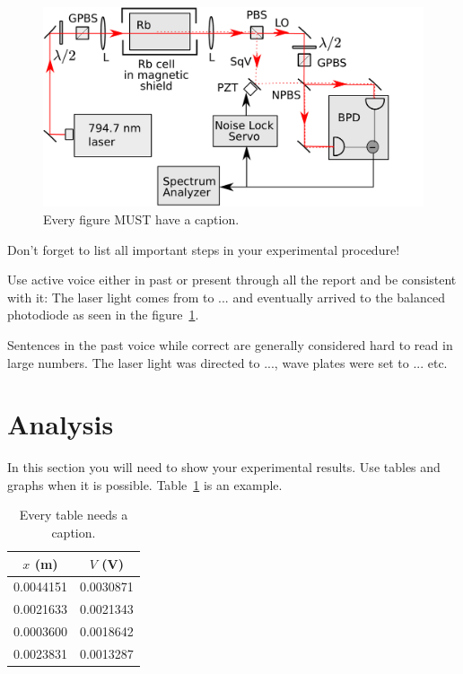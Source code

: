 \documentclass[letterpaper,12pt]{article}
\begin{document}
\begin{figure}[ht] 
        \centering \includegraphics[width=0.8\columnwidth]{sr_setup}
        \caption{
                \label{fig:samplesetup} %
                Every figure MUST have a caption.
        }
\end{figure}

Don't forget to list all important steps in your experimental procedure!

Use active voice either in past or present through all the report and be
consistent with it:
The laser light comes  from to ... and eventually arrived to the
balanced photodiode as seen in the figure~\ref{fig:samplesetup}.

Sentences in the past voice while correct are generally considered hard to read
in large numbers. The laser light was directed to ..., wave plates were set
to ... etc.


\section{Analysis}

In this section you will need to show your experimental results. Use tables and
graphs when it is possible. Table~\ref{tbl:bins} is an example.

\begin{table}[ht]
\begin{center}
\caption{Every table needs a caption.}
\label{tbl:bins} %
\begin{tabular}{|cc|} 
\hline
\multicolumn{1}{|c}{$x$ (m)} & \multicolumn{1}{c|}{$V$ (V)} \\
\hline
0.0044151 &   0.0030871 \\
0.0021633 &   0.0021343 \\
0.0003600 &   0.0018642 \\
0.0023831 &   0.0013287 \\
\hline
\end{tabular}
\end{center}
\end{table}
\end{document}
